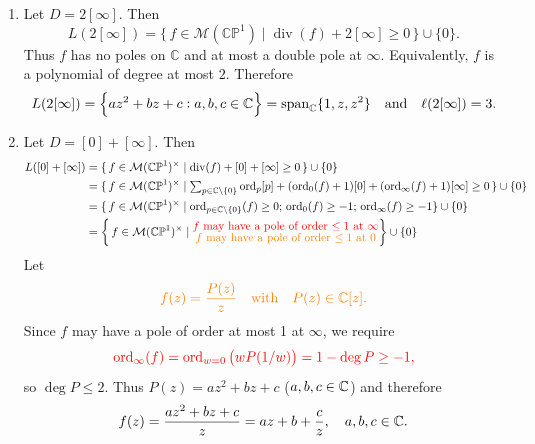 \documentclass[11pt,openany]{article}
\newcommand{\ord}{\operatorname{ord}}
\begin{document}
\begin{example}
\begin{enumerate}[(1)]
\begin{align*}
		&=\set{\,f\in\mathcal M(\mathbb{CP}^1)^\times\mid \substack{\text{\normalsize\color{red} $f$ may have a pole of order $\leq 1$ at $\infty$}\\ \text{\normalsize\color{orange} $f$ has no pole at any finite point $p\in\C$}}}\cup\{0\}
	\end{align*}
	Let \[
	\color{orange} f(z)=P(z)\quad\text{with}\quad P(z)\in\C[z].
	\]
	Since $f$ may have a pole of order at most 1 at $\infty$, we require \[
	\color{red}\ord_{\infty}(f)=\ord_{w=0}\left(P(1/w)\right)=-\deg P\ge -1,
	\] so $\deg P\leq 1$. Thus $P(z)=az+b$ ($a,b\in\C$)
	and therefore \[
	f(z)=az+b,\quad a,b\in\C.
	\] Hence
	\[
	L([\infty])=\set{az+b:a,b\in\C}=\operatorname{span}_\C\{1,z\}
	\quad\text{and}\quad
	\ell([\infty])=2.
	\]
	\item {\color{blue} Let $D=2[\infty]$.} Then
	\[
	L(2[\infty])
	=
	\{\,f\in\mathcal M(\mathbb{CP}^1)\mid \operatorname{div}(f)+2[\infty]\ge 0\,\}\cup\{0\}.
	\]
	Thus $f$ has no poles on $\mathbb C$ and at most a double pole at $\infty$.
	Equivalently, $f$ is a polynomial of degree at most $2$. Therefore
	\[
	L(2[\infty])=\set{az^2+bz+c:a,b,c\in\mathbb{C}}=\operatorname{span}_{\mathbb{C}}\{1,z,z^2\}
	\quad\text{and}\quad
	\ell(2[\infty])=3.
	\]
	\newpage
	\item {\color{blue} Let $D=[0]+[\infty]$.} Then
	\begin{align*}
		L([0]+[\infty])&=\{\,f\in\mathcal M(\mathbb{CP}^1)^\times\mid \operatorname{div}(f)+[0]+[\infty]\ge 0\,\}\cup\{0\}\\
		&=\{\,f\in\mathcal M(\mathbb{CP}^1)^\times\mid \textstyle\sum_{p\in\C\setminus\{0\}}\ord_p[p]+(\ord_0(f)+1)[0]+(\ord_\infty(f)+1)[\infty]\ge 0\,\}\cup\{0\}\\
		&=\{\,f\in\mathcal M(\mathbb{CP}^1)^\times\mid \ord_{p\in\C\setminus\{0\}}(f)\geq 0;\,\ord_0(f)\geq -1; \,\ord_{\infty}(f)\geq -1\}\cup\{0\} \\
		&=\set{\,f\in\mathcal M(\mathbb{CP}^1)^\times\mid \substack{\text{\normalsize\color{red} $f$ may have a pole of order $\leq 1$ at $\infty$}\\ \text{\normalsize\color{orange} $f$ may have a pole of order $\leq 1$ at $0$}}}\cup\{0\}
	\end{align*}
	Let \[
	\color{orange} f(z)=\frac{P(z)}{z}\quad\text{with}\quad P(z)\in\mathbb{C}[z].
	\]
	Since $f$ may have a pole of order at most 1 at $\infty$, we require \[
	\color{red}\ord_{\infty}(f)=\ord_{w=0}\left(wP(1/w)\right)=1-\deg P\ge -1,
	\] so $\deg P\leq 2$. Thus $P(z)=az^2+bz+c$ ($a,b,c\in\mathbb{C}$)
	and therefore \[
	f(z)=\frac{az^2+bz+c}{z}=az+b+\frac{c}{z},\quad a,b,c\in\mathbb{C}.
\]
\end{enumerate}
\end{example}
\end{document}
